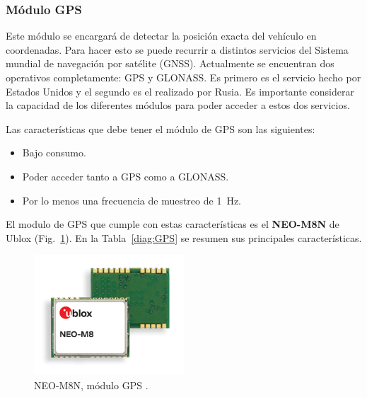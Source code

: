 \subsubsection{Módulo GPS}
Este módulo se encargará de detectar la posición exacta del vehículo en coordenadas. Para hacer esto se puede recurrir a distintos servicios del Sistema mundial de navegación por satélite (GNSS). Actualmente se encuentran dos operativos completamente: GPS y GLONASS. Es primero es el servicio hecho por Estados Unidos y el segundo es el realizado por Rusia. Es importante considerar la capacidad de los diferentes módulos para poder acceder a estos dos servicios.

Las características que debe tener el módulo de GPS son las siguientes:
\begin{itemize}
    \itemsep0em
    \item Bajo consumo.
    \item Poder acceder tanto a GPS como a GLONASS.
    \item Por lo menos una frecuencia de muestreo de \SI{1}{Hz}.
\end{itemize}

El modulo de GPS que cumple con estas características es el \textbf{NEO-M8N} de Ublox (Fig.~\ref{fig:GPS}). En la Tabla~\ref{diag:GPS} se resumen sus principales características.
\begin{figure}[hbtp!]
\centering
\includegraphics[width=0.5\textwidth]{NEO-M8.png}
\caption[NEO-M8N, módulo GPS]{NEO-M8N, módulo GPS \cite{GPS}.}
\label{fig:GPS}
\end{figure}

